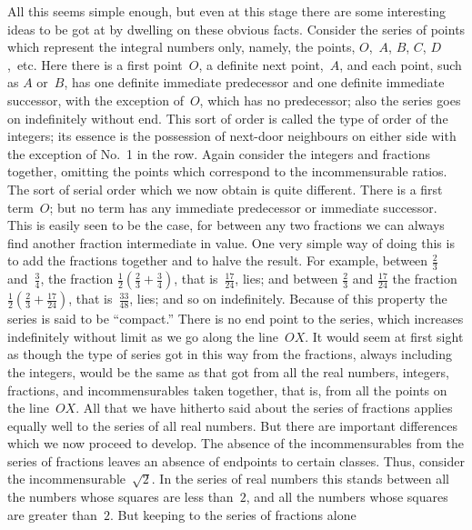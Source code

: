 \documentclass[12pt,leqno]{book}[2005/09/16]
\newcommand{\PageSep}[1]{\ignorespaces}
\begin{document}
All this seems simple enough, but even at
%
this stage there are some interesting ideas to
be got at by dwelling on these obvious facts.
Consider the series of points which represent
the integral numbers only, namely, the points,
$O$,~$A$, $B$, $C$, $D$,~etc. Here there is a first point~$O$,
a definite next point,~$A$, and each point,
such as $A$ or~$B$, has one definite immediate
predecessor and one definite immediate successor,
with the exception of~$O$, which has no
predecessor; also the series goes on indefinitely
without end. This sort of order is
called the type of order of the integers; its
essence is the possession of next-door neighbours
on either side with the exception of
No.~1 in the row. Again consider the integers
and fractions together, omitting the points
which correspond to the incommensurable
ratios. The sort of serial order which we now
obtain is quite different. There is a first
term~$O$; but no term has any immediate predecessor
or immediate successor. This is
easily seen to be the case, for between any
two fractions we can always find another
fraction intermediate in value. One very
simple way of doing this is to add the fractions
together and to halve the result. For example,
between $\frac{2}{3}$ and~$\frac{3}{4}$, the fraction $\frac{1}{2}(\frac{2}{3} + \frac{3}{4})$,
that is~$\frac{17}{24}$, lies; and between $\frac{2}{3}$ and $\frac{17}{24}$ the
\PageSep{76}
%
fraction $\frac{1}{2}(\frac{2}{3} + \frac{17}{24})$, that is~$\frac{33}{48}$, lies; and so on
indefinitely. Because of this property the
series is said to be ``compact.'' There is no
end point to the series, which increases indefinitely
without limit as we go along the
line~$OX$. It would seem at first sight as
though the type of series got in this way from
the fractions, always including the integers,
would be the same as that got from all the
real numbers, integers, fractions, and incommensurables
taken together, that is, from all
the points on the line~$OX$. All that we have
hitherto said about the series of fractions
applies equally well to the series of all real
numbers. But there are important differences
which we now proceed to develop. The
absence of the incommensurables from the
series of fractions leaves an absence of endpoints
to certain classes. Thus, consider the
incommensurable~$\sqrt{2}$. In the series of real
numbers this stands between all the numbers
whose squares are less than~$2$, and all the
numbers whose squares are greater than~$2$.
But keeping to the series of fractions alone
\end{document}
